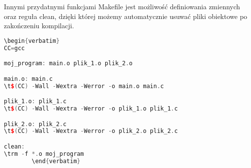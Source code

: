 \documentclass[notheorems, aspectratio=54]{beamer}
\begin{document}
\begin{frame}
	Innymi przydatnymi funkcjami Makefile jest możliwość definiowania zmiennych oraz reguła clean,
	dzięki której możemy automatycznie usuwać pliki obiektowe po zakończeniu kompilacji.
	
	\begin{lstlisting}[language=C++]
\begin{verbatim}
CC=gcc

moj_program: main.o plik_1.o plik_2.o

main.o: main.c
\t$(CC) -Wall -Wextra -Werror -o main.o main.c

plik_1.o: plik_1.c
\t$(CC) -Wall -Wextra -Werror -o plik_1.o plik_1.c

plik_2.o: plik_2.c
\t$(CC) -Wall -Wextra -Werror -o plik_2.o plik_2.c

clean:
\trm -f *.o moj_program
		\end{verbatim}
	\end{lstlisting}
	
\end{frame}

	
\end{document}
